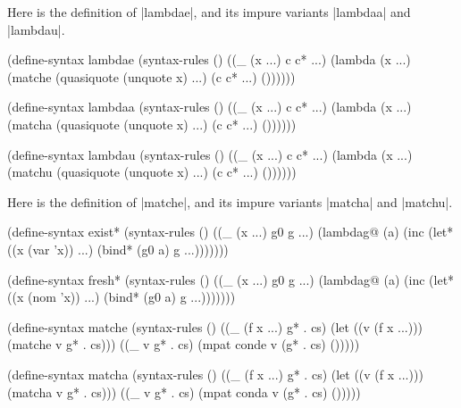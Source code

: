 Here is the definition of \scheme|lambdae|,
and its impure variants \scheme|lambdaa| and \scheme|lambdau|.

\schemedisplayspace
\begin{schemedisplay}
(define-syntax lambdae
  (syntax-rules ()
    ((_ (x ...) c c* ...)
     (lambda (x ...) (matche (quasiquote (unquote x) ...) (c c* ...) ())))))

(define-syntax lambdaa
  (syntax-rules ()
    ((_ (x ...) c c* ...)
     (lambda (x ...) (matcha (quasiquote (unquote x) ...) (c c* ...) ())))))

(define-syntax lambdau
  (syntax-rules ()
    ((_ (x ...) c c* ...)
     (lambda (x ...) (matchu (quasiquote (unquote x) ...) (c c* ...) ())))))
\end{schemedisplay}

Here is the definition of \scheme|matche|, and its impure variants \scheme|matcha| and \scheme|matchu|.

\schemedisplayspace
\begin{schemedisplay}
(define-syntax exist*
  (syntax-rules ()
    ((_ (x ...) g0 g ...)
     (lambdag@ (a)
       (inc
         (let* ((x (var 'x)) ...)
           (bind* (g0 a) g ...)))))))

(define-syntax fresh*
  (syntax-rules ()
    ((_ (x ...) g0 g ...)
     (lambdag@ (a)
       (inc
         (let* ((x (nom 'x)) ...)
           (bind* (g0 a) g ...)))))))

(define-syntax matche
  (syntax-rules ()
    ((_ (f x ...) g* . cs)
     (let ((v (f x ...))) (matche v g* . cs)))
    ((_ v g* . cs) (mpat conde v (g* . cs) ()))))

(define-syntax matcha
  (syntax-rules ()
    ((_ (f x ...) g* . cs)
     (let ((v (f x ...))) (matcha v g* . cs)))
    ((_ v g* . cs) (mpat conda v (g* . cs) ()))))
\end{schemedisplay}

\newpage

